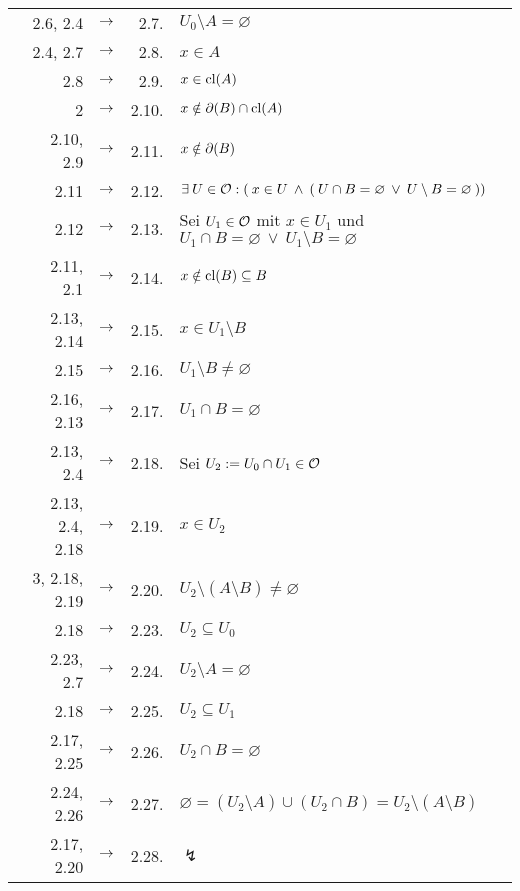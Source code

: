 \begin{longtable}{r r c r l}
        & 2.6, 2.4 & $\rightarrow$ & 2.7. & $U_0 \setminus A = \varnothing$ \\
        & 2.4, 2.7 & $\rightarrow$ & 2.8. & $x \in A$ \\
        & 2.8 & $\rightarrow$ & 2.9. & $x \in \text{cl}(A)$ \\
        & 2 & $\rightarrow$ & 2.10. & $x \notin \partial(B) \cap \text{cl}(A)$ \\
        & 2.10, 2.9 & $\rightarrow$ & 2.11. & $x \notin \partial(B)$ \\
        & 2.11 & $\rightarrow$ & 2.12. & $\exists\: U \in \mathcal{O} : (\: x \in U \:\land\: (\: U \cap B = \varnothing \:\lor\: U \setminus B = \varnothing \:))$ \\
        & 2.12 & $\rightarrow$ & 2.13. & Sei $U_1 \in \mathcal{O}$ mit $x \in U_1$ und $U_1 \cap B = \varnothing \:\lor\: U_1 \setminus B = \varnothing$ \\
        & 2.11, 2.1 & $\rightarrow$ & 2.14. & $x \notin \text{cl}(B) \subseteq B$ \\
        & 2.13, 2.14 & $\rightarrow$ & 2.15. & $x \in U_1 \setminus B$ \\
        & 2.15 & $\rightarrow$ & 2.16. & $U_1 \setminus B \neq \varnothing$ \\
        & 2.16, 2.13 & $\rightarrow$ & 2.17. & $U_1 \cap B = \varnothing$ \\
        & 2.13, 2.4 & $\rightarrow$ & 2.18. & Sei $U_2 := U_0 \cap U_1 \in \mathcal{O}$ \\
        & 2.13, 2.4, 2.18 & $\rightarrow$ & 2.19. & $x \in U_2$ \\
        & 3, 2.18, 2.19 & $\rightarrow$ & 2.20. & $U_2 \setminus (A \setminus B) \neq \varnothing$ \\
        & 2.18 & $\rightarrow$ & 2.23. & $U_2 \subseteq U_0$ \\
        & 2.23, 2.7 & $\rightarrow$ & 2.24. & $U_2 \setminus A = \varnothing$ \\
        & 2.18 & $\rightarrow$ & 2.25. & $U_2 \subseteq U_1$ \\
        & 2.17, 2.25 & $\rightarrow$ & 2.26. & $U_2 \cap B = \varnothing$ \\
        & 2.24, 2.26 & $\rightarrow$ & 2.27. & $\varnothing = (U_2 \setminus A) \cup (U_2 \cap B) = U_2 \setminus (A \setminus B)$ \\
        & 2.17, 2.20 & $\rightarrow$ & 2.28. & $\lightning$ \\
    \end{longtable}
    
    

